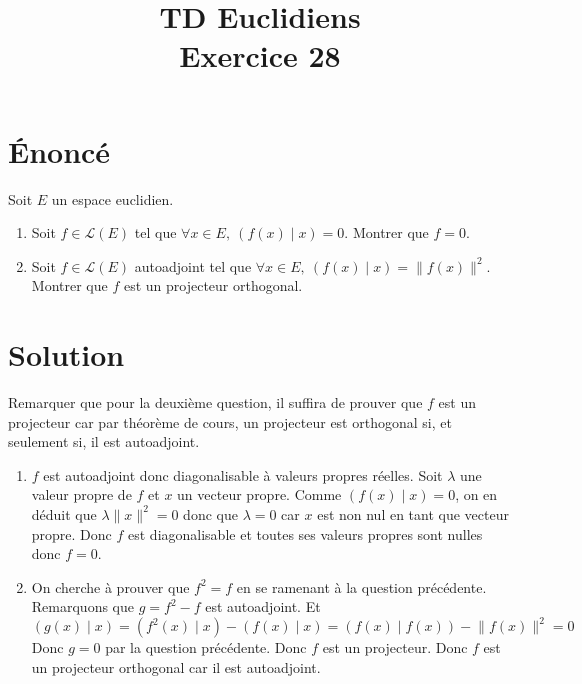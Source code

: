 \documentclass[french]{article}
\title{TD Euclidiens\\ Exercice 28}
\date{}
\begin{document}
\maketitle

\section{Énoncé}
Soit $E$ un espace euclidien.
\begin{enumerate}
	\item Soit $f\in\mathcal{L}(E)$ tel que $\forall x\in E,\ (f(x)\mid x)=0$. Montrer que $f=0$.
	\item Soit $f\in\mathcal{L}(E)$ autoadjoint tel que $\forall x\in E,\ (f(x)\mid x)=\lVert f(x)\rVert^2$. Montrer que $f$ est un projecteur orthogonal.
\end{enumerate}
\section{Solution}
Remarquer que pour la deuxième question, il suffira de prouver que $f$ est un projecteur car par théorème de cours, un projecteur est orthogonal si, et seulement si, il est autoadjoint.
\begin{enumerate}
	\item $f$ est autoadjoint donc diagonalisable à valeurs propres réelles. Soit $\lambda$ une valeur propre de $f$ et $x$ un vecteur propre. Comme $(f(x)\mid x)=0$, on en déduit que $\lambda\lVert x\rVert^2=0$ donc que $\lambda=0$ car $x$ est non nul en tant que vecteur propre. Donc $f$ est diagonalisable et toutes ses valeurs propres sont nulles donc $f=0$.
	\item On cherche à prouver que $f^2=f$ en se ramenant à la question précédente. Remarquons que $g=f^2-f$ est autoadjoint. Et $$(g(x)\mid x)=(f^2(x)\mid x)-(f(x)\mid x)=(f(x)\mid f(x))-\lVert f(x)\rVert^2=0$$ Donc $g=0$ par la question précédente. Donc $f$ est un projecteur. Donc $f$ est un projecteur orthogonal car il est autoadjoint.
\end{enumerate}
\end{document}
